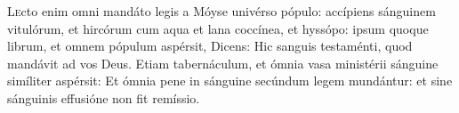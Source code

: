 
\lettrine{L}{e}cto enim omni mandáto legis a Móyse univérso pópulo: accípiens sánguinem vitulórum, et hircórum cum aqua et lana coccínea, et hyssópo: ipsum quoque librum, et omnem pópulum aspérsit, 
Dicens: Hic sanguis testaménti, quod mandávit ad vos Deus. 
Etiam tabernáculum, et ómnia vasa ministérii sánguine simíliter aspérsit: 
Et ómnia pene in sánguine secúndum legem mundántur: et sine sánguinis effusióne non fit remíssio.